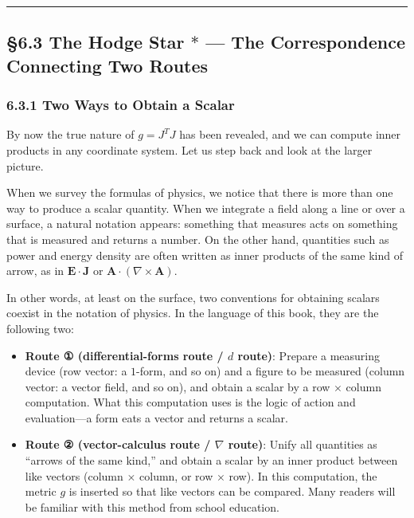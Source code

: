 \begin{center}\rule{0.5\linewidth}{0.5pt}\end{center}

\hypertarget{the-hodge-star-ast-the-correspondence-connecting-two-routes}{%
\subsection{\texorpdfstring{§6.3 The Hodge Star \(\ast\) --- The
Correspondence Connecting Two
Routes}{§6.3 The Hodge Star \textbackslash ast --- The Correspondence Connecting Two Routes}}\label{the-hodge-star-ast-the-correspondence-connecting-two-routes}}

\hypertarget{two-ways-to-obtain-a-scalar}{%
\subsubsection{6.3.1 Two Ways to Obtain a
Scalar}\label{two-ways-to-obtain-a-scalar}}

By now the true nature of \(g = J^T J\) has been revealed, and we can
compute inner products in any coordinate system. Let us step back and
look at the larger picture.

When we survey the formulas of physics, we notice that there is more
than one way to produce a scalar quantity. When we integrate a field
along a line or over a surface, a natural notation appears: something
that measures acts on something that is measured and returns a number.
On the other hand, quantities such as power and energy density are often
written as inner products of the same kind of arrow, as in
\(\mathbf{E}\cdot\mathbf{J}\) or
\(\mathbf{A}\cdot(\nabla\times\mathbf{A})\).

In other words, at least on the surface, two conventions for obtaining
scalars coexist in the notation of physics. In the language of this
book, they are the following two:

\begin{itemize}
\item
  \textbf{Route ① (differential-forms route / $d$ route)}: Prepare a
  measuring device (row vector: a \(1\)-form, and so on) and a figure to
  be measured (column vector: a vector field, and so on), and obtain a
  scalar by a row \(\times\) column computation. What this computation
  uses is the logic of action and evaluation---a form eats a vector and
  returns a scalar.
\item
  \textbf{Route ② (vector-calculus route / $\nabla$ route)}: Unify all
  quantities as ``arrows of the same kind,'' and obtain a scalar by an
  inner product between like vectors (column \(\times\) column, or row
  \(\times\) row). In this computation, the metric \(g\) is inserted so
  that like vectors can be compared. Many readers will be familiar with
  this method from school education.
\end{itemize}

